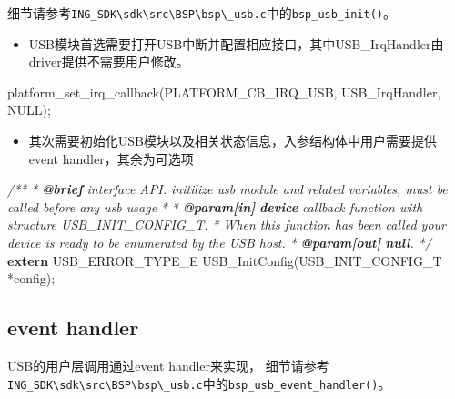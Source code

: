 \documentclass[
  12pt,
]{book}
\newenvironment{Shaded}{\begin{snugshade}}{\end{snugshade}}
\newcommand{\AnnotationTok}[1]{\textcolor[rgb]{0.56,0.35,0.01}{\textbf{\textit{#1}}}}
\newcommand{\CommentTok}[1]{\textcolor[rgb]{0.56,0.35,0.01}{\textit{#1}}}
\newcommand{\CommentVarTok}[1]{\textcolor[rgb]{0.56,0.35,0.01}{\textbf{\textit{#1}}}}
\newcommand{\KeywordTok}[1]{\textcolor[rgb]{0.13,0.29,0.53}{\textbf{#1}}}
\newcommand{\NormalTok}[1]{#1}
\providecommand{\tightlist}{%
  \setlength{\itemsep}{0pt}\setlength{\parskip}{0pt}}
\begin{document}
细节请参考\texttt{ING\_SDK\textbackslash{}sdk\textbackslash{}src\textbackslash{}BSP\textbackslash{}bsp\textbackslash{}\_usb.c}中的\texttt{bsp\_usb\_init()}。

\begin{itemize}
\tightlist
\item
  USB模块首选需要打开USB中断并配置相应接口，其中USB\_IrqHandler由driver提供不需要用户修改。
\end{itemize}

\begin{Shaded}
\begin{Highlighting}[]
\NormalTok{  platform_set_irq_callback(PLATFORM_CB_IRQ_USB, USB_IrqHandler, NULL);}
\end{Highlighting}
\end{Shaded}

\begin{itemize}
\tightlist
\item
  其次需要初始化USB模块以及相关状态信息，入参结构体中用户需要提供event handler，其余为可选项
\end{itemize}

\begin{Shaded}
\begin{Highlighting}[]
\CommentTok{/**}
\CommentTok{ * }\AnnotationTok{@brief}\CommentTok{ interface API. initilize usb module and related variables, must be called before any usb usage }
\CommentTok{ *}
\CommentTok{ * }\AnnotationTok{@param[in]}\CommentTok{ }\CommentVarTok{device}\CommentTok{ callback function with structure USB_INIT_CONFIG_T. }
\CommentTok{ *            When this function has been called your device is ready to be enumerated by the USB host.}
\CommentTok{ * }\AnnotationTok{@param[out]}\CommentTok{ }\CommentVarTok{null}\CommentTok{. }
\CommentTok{ */}
\KeywordTok{extern}\NormalTok{ USB_ERROR_TYPE_E USB_InitConfig(USB_INIT_CONFIG_T *config);}
\end{Highlighting}
\end{Shaded}

\hypertarget{event-handler}{%
\subsection{event handler}\label{event-handler}}

USB的用户层调用通过event handler来实现， 细节请参考\texttt{ING\_SDK\textbackslash{}sdk\textbackslash{}src\textbackslash{}BSP\textbackslash{}bsp\textbackslash{}\_usb.c}中的\texttt{bsp\_usb\_event\_handler()}。
\end{document}
